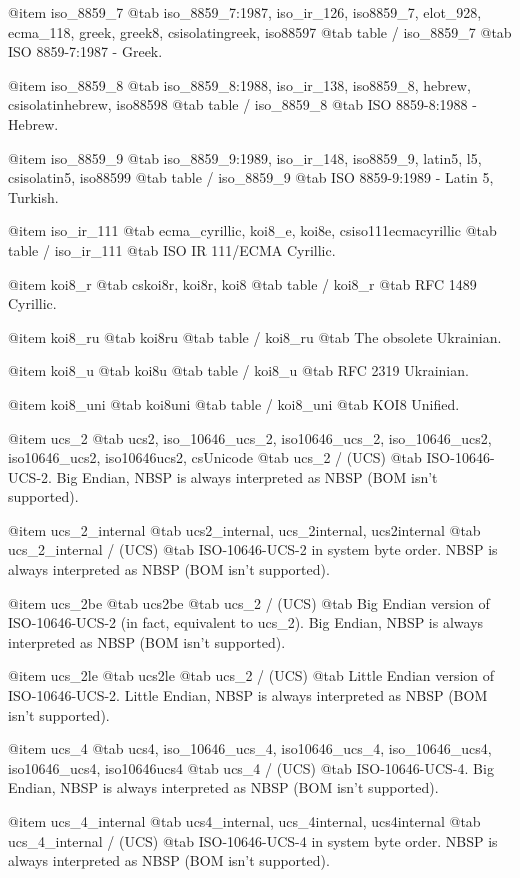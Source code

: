 @item
iso_8859_7
@tab
iso_8859_7:1987, iso_ir_126, iso8859_7, elot_928, ecma_118, greek, greek8, csisolatingreek, iso88597
@tab
table / iso_8859_7
@tab
ISO 8859-7:1987 - Greek.


@item
iso_8859_8
@tab
iso_8859_8:1988, iso_ir_138, iso8859_8, hebrew, csisolatinhebrew, iso88598
@tab
table / iso_8859_8
@tab
ISO 8859-8:1988 - Hebrew.


@item
iso_8859_9
@tab
iso_8859_9:1989, iso_ir_148, iso8859_9, latin5, l5, csisolatin5, iso88599
@tab
table / iso_8859_9
@tab
ISO 8859-9:1989 - Latin 5, Turkish.


@item
iso_ir_111
@tab
ecma_cyrillic, koi8_e, koi8e, csiso111ecmacyrillic
@tab
table / iso_ir_111
@tab
ISO IR 111/ECMA Cyrillic.


@item
koi8_r
@tab
cskoi8r, koi8r, koi8
@tab
table / koi8_r
@tab
RFC 1489 Cyrillic.


@item
koi8_ru
@tab
koi8ru
@tab
table / koi8_ru
@tab
The obsolete Ukrainian.


@item
koi8_u
@tab
koi8u
@tab
table / koi8_u
@tab
RFC 2319 Ukrainian.


@item
koi8_uni
@tab
koi8uni
@tab
table / koi8_uni
@tab
KOI8 Unified.


@item
ucs_2
@tab
ucs2, iso_10646_ucs_2, iso10646_ucs_2, iso_10646_ucs2, iso10646_ucs2, iso10646ucs2, csUnicode
@tab
ucs_2 / (UCS)
@tab
ISO-10646-UCS-2. Big Endian, NBSP is always interpreted as NBSP (BOM isn't supported).


@item
ucs_2_internal
@tab
ucs2_internal, ucs_2internal, ucs2internal
@tab
ucs_2_internal / (UCS)
@tab
ISO-10646-UCS-2 in system byte order.
NBSP is always interpreted as NBSP (BOM isn't supported).


@item
ucs_2be
@tab
ucs2be
@tab
ucs_2 / (UCS)
@tab
Big Endian version of ISO-10646-UCS-2 (in fact, equivalent to ucs_2).
Big Endian, NBSP is always interpreted as NBSP (BOM isn't supported).


@item
ucs_2le
@tab
ucs2le
@tab
ucs_2 / (UCS)
@tab
Little Endian version of ISO-10646-UCS-2.
Little Endian, NBSP is always interpreted as NBSP (BOM isn't supported).


@item
ucs_4
@tab
ucs4, iso_10646_ucs_4, iso10646_ucs_4, iso_10646_ucs4, iso10646_ucs4, iso10646ucs4
@tab
ucs_4 / (UCS)
@tab
ISO-10646-UCS-4. Big Endian, NBSP is always interpreted as NBSP (BOM isn't supported).


@item
ucs_4_internal
@tab
ucs4_internal, ucs_4internal, ucs4internal
@tab
ucs_4_internal / (UCS)
@tab
ISO-10646-UCS-4 in system byte order.
NBSP is always interpreted as NBSP (BOM isn't supported).


